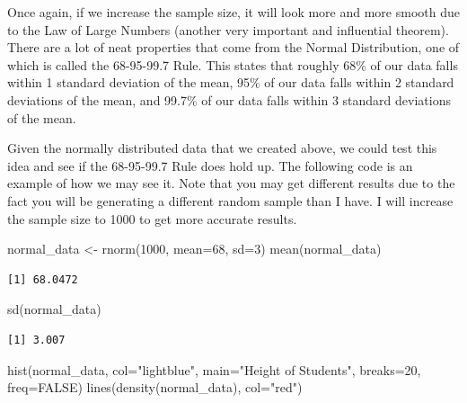 \documentclass[
  letterpaper,
  DIV=11,
  numbers=noendperiod]{scrreprt}
\newenvironment{Shaded}{\begin{snugshade}}{\end{snugshade}}
\newcommand{\AttributeTok}[1]{\textcolor[rgb]{0.40,0.45,0.13}{#1}}
\newcommand{\ConstantTok}[1]{\textcolor[rgb]{0.56,0.35,0.01}{#1}}
\newcommand{\DecValTok}[1]{\textcolor[rgb]{0.68,0.00,0.00}{#1}}
\newcommand{\FunctionTok}[1]{\textcolor[rgb]{0.28,0.35,0.67}{#1}}
\newcommand{\NormalTok}[1]{\textcolor[rgb]{0.00,0.23,0.31}{#1}}
\newcommand{\OtherTok}[1]{\textcolor[rgb]{0.00,0.23,0.31}{#1}}
\newcommand{\StringTok}[1]{\textcolor[rgb]{0.13,0.47,0.30}{#1}}
\begin{document}
Once again, if we increase the sample size, it will look more and more
smooth due to the Law of Large Numbers (another very important and
influential theorem). There are a lot of neat properties that come from
the Normal Distribution, one of which is called the 68-95-99.7 Rule.
This states that roughly 68\% of our data falls within 1 standard
deviation of the mean, 95\% of our data falls within 2 standard
deviations of the mean, and 99.7\% of our data falls within 3 standard
deviations of the mean.

Given the normally distributed data that we created above, we could test
this idea and see if the 68-95-99.7 Rule does hold up. The following
code is an example of how we may see it. Note that you may get different
results due to the fact you will be generating a different random sample
than I have. I will increase the sample size to 1000 to get more
accurate results.

\begin{Shaded}
\begin{Highlighting}[]
\NormalTok{normal\_data }\OtherTok{\textless{}{-}} \FunctionTok{rnorm}\NormalTok{(}\DecValTok{1000}\NormalTok{, }\AttributeTok{mean=}\DecValTok{68}\NormalTok{, }\AttributeTok{sd=}\DecValTok{3}\NormalTok{)}
\FunctionTok{mean}\NormalTok{(normal\_data)}
\end{Highlighting}
\end{Shaded}

\begin{verbatim}
[1] 68.0472
\end{verbatim}

\begin{Shaded}
\begin{Highlighting}[]
\FunctionTok{sd}\NormalTok{(normal\_data)}
\end{Highlighting}
\end{Shaded}

\begin{verbatim}
[1] 3.007
\end{verbatim}

\begin{Shaded}
\begin{Highlighting}[]
\FunctionTok{hist}\NormalTok{(normal\_data, }\AttributeTok{col=}\StringTok{"lightblue"}\NormalTok{, }\AttributeTok{main=}\StringTok{"Height of Students"}\NormalTok{, }
     \AttributeTok{breaks=}\DecValTok{20}\NormalTok{, }\AttributeTok{freq=}\ConstantTok{FALSE}\NormalTok{)}
\FunctionTok{lines}\NormalTok{(}\FunctionTok{density}\NormalTok{(normal\_data), }\AttributeTok{col=}\StringTok{"red"}\NormalTok{)}
\end{Highlighting}
\end{Shaded}
\end{document}
